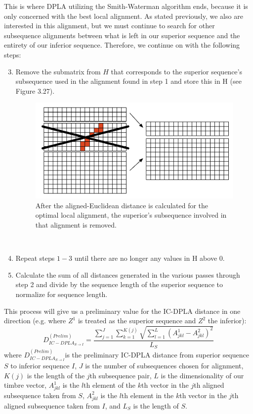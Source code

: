\documentclass[a4paper,12pt]{report} 	%
\numberwithin{figure}{chapter}
\numberwithin{table}{chapter}
\numberwithin{equation}{chapter}
\begin{document}
\begin{flushleft}
This is where DPLA utilizing the Smith-Waterman algorithm ends, because it is only concerned with the best local alignment. As stated previously, we also are interested in this alignment, but we must continue to search for other subsequence alignments between what is left in our superior sequence and the entirety of our inferior sequence. Therefore, we continue on with the following steps:
\begin{enumerate}
\setcounter{enumi}{2}
\item Remove the submatrix from $H$ that corresponds to the superior sequence's subsequence used in the alignment found in step 1 and store this in H (see Figure 3.27).
\begin{figure}[h!]
\begin{center}
\includegraphics[scale=0.8]{SIC-DPLA_2}
\caption[Removing Optimal Subsequence]{After the aligned-Euclidean distance is calculated for the optimal local alignment, the superior's subsequence involved in that alignment is removed.}
\end{center}
\end{figure}
\\
\item Repeat steps $1-3$ until there are no longer any values in H above 0.
\item Calculate the sum of all distances generated in the various passes through step 2 and divide by the sequence length of the superior sequence to normalize for sequence length.
\end{enumerate}
This process will give us a preliminary value for the IC-DPLA distance in one direction (e.g. where $Z^1$ is treated as the superior sequence and $Z^2$ the inferior):
\begin{equation}
D_{IC-DPLA_{S \to I}}^{(Prelim)} = \frac{\sum_{j=1}^J \sum_{k=1}^{K(j)} \sqrt{ \sum_{l=1}^L (A_{jkl}^1 - A_{jkl}^2)^2}}{L_S}
\end{equation}
where $D_{IC-DPLA_{S \to I}}^{(Prelim)} $is the preliminary IC-DPLA distance from superior sequence $S$ to inferior sequence $I$, $J$ is the number of subsequences chosen for alignment, $K(j)$ is the length of the $j$th subsequence pair, $L$ is the dimensionality of our timbre vector, $A_{jkl}^1$ is the $l$th element of the $k$th vector in the $j$th aligned subsequence taken from $S$, $A_{jkl}^2$ is the $l$th element in the $k$th vector in the $j$th aligned subsequence taken from $I$, and $L_S$ is the length of $S$.


\end{flushleft}
\end{document}
